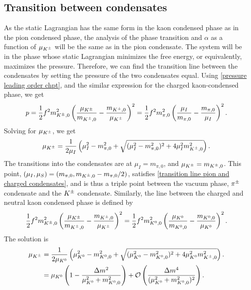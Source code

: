 \subsection{Transition between condensates}


As the static Lagrangian has the same form in the kaon condensed phase as in the pion condensed phase, the analysis of the phase transition and $\alpha$ as a function of $\mu_{K^\pm}$ will be the same as in the pion condensate.
The system will be in the phase whose static Lagrangian minimizes the free energy, or equivalently, maximizes the pressure.
Therefore, we can find the transition line between the condensates by setting the pressure of the two condensates equal.
Using \autoref{pressure leading order chpt}, and the similar expression for the charged kaon-condensed phase, we get
%
\begin{equation}
    p 
    = \frac{1}{2} f^2 m_{{K^\pm},0}^2 \left( \frac{\mu_{K^\pm}}{m_{{K^\pm},0}} - \frac{m_{{K^\pm},0}}{\mu_{K^\pm}} \right)^2
    =
    \frac{1}{2} f^2m_{\pi,0}^2  \left( \frac{\mu_I}{m_{\pi,0}} - \frac{m_{\pi,0}}{\mu_I} \right)^2.
\end{equation}
%
Solving for $\mu_{K^\pm}$, we get
%
\begin{equation}
    \label{transition line pion and charged condensates}
    \mu_{K^\pm} =\frac{1}{2\mu_I} \left(\mu_I^2 - m_{\pi,0}^2  + \sqrt{(\mu_I^2 - m_{\pi,0}^2)^2 + 4\mu_I^2 m_{{K^\pm},0}^2}\right).
\end{equation}
%
The transitions into the condensates are at $\mu_I = m_{\pi,0}$, and $\mu_{K^\pm} = m_{{K^\pm},0}$.
This point, $(\mu_I, \mu_S) = (m_{\pi,0}, m_{{K^\pm},0} - m_{\pi,0}/2)$, satisfies \autoref{transition line pion and charged condensates}, and is thus a triple point between the vacuum phase, ${\pi^\pm}$ condensate and the ${K^\pm}$ condensate. 
Similarly, the line between the charged and neutral kaon condensed phase is defined by
%
\begin{equation}
    \frac{1}{2} f^2 m_{{K^\pm},0}^2 \left( \frac{\mu_{K^\pm}}{m_{{K^\pm},0}} - \frac{m_{{K^\pm},0}}{\mu_{K^\pm}} \right)^2
    =
    \frac{1}{2} f^2 m_{{K^0},0}^2 \left( \frac{\mu_{K^0}}{m_{{K^0},0}} - \frac{m_{{K^0},0}}{\mu_{K^0}} \right)^2.
\end{equation}
%
The solution is
% 
\begin{align}
    \nonumber
    \mu_{K^\pm} 
    &= \frac{1}{2 \mu_{K^0}}
    \left(
        \mu_{K^0}^2 - m_{{K^0},0}^2  + \sqrt{(\mu_{K^0}^2 - m_{{K^0},0}^2)^2 + 4\mu_{K^0}^2m_{{K^\pm},0}^2}
    \right).
    \\
    &= \mu_{K^0} 
    \left(1 - \frac{\Delta m^2}{\mu_{K^0}^2 + m_{{K^0},0}^2}\right)
    + \mathcal O\left( \frac{\Delta m^4}{ (\mu_{K^0}^2 + m_{{K^0},0}^2)^2} \right).
\end{align}
